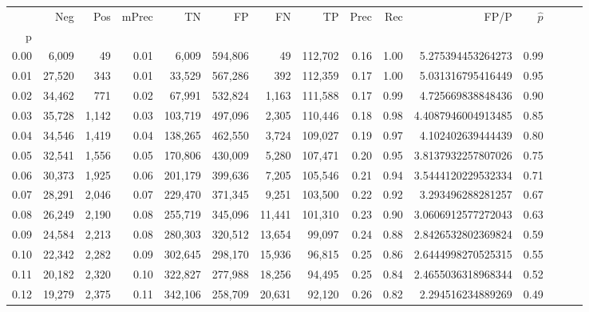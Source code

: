 \begin{tabular}{rrrrrrrrrrrrrrr}
\toprule
{} &     Neg &    Pos & mPrec &       TN &       FP &       FN &       TP &  Prec &   Rec &                   FP/P & $\hat{p}$ \\
p    &         &        &       &          &          &          &          &       &       &                        &           \\
\midrule
0.00 &   6,009 &     49 &  0.01 &    6,009 &  594,806 &       49 &  112,702 &  0.16 &  1.00 &      5.275394453264273 &      0.99 \\
0.01 &  27,520 &    343 &  0.01 &   33,529 &  567,286 &      392 &  112,359 &  0.17 &  1.00 &      5.031316795416449 &      0.95 \\
0.02 &  34,462 &    771 &  0.02 &   67,991 &  532,824 &    1,163 &  111,588 &  0.17 &  0.99 &      4.725669838848436 &      0.90 \\
0.03 &  35,728 &  1,142 &  0.03 &  103,719 &  497,096 &    2,305 &  110,446 &  0.18 &  0.98 &     4.4087946004913485 &      0.85 \\
0.04 &  34,546 &  1,419 &  0.04 &  138,265 &  462,550 &    3,724 &  109,027 &  0.19 &  0.97 &      4.102402639444439 &      0.80 \\
0.05 &  32,541 &  1,556 &  0.05 &  170,806 &  430,009 &    5,280 &  107,471 &  0.20 &  0.95 &     3.8137932257807026 &      0.75 \\
0.06 &  30,373 &  1,925 &  0.06 &  201,179 &  399,636 &    7,205 &  105,546 &  0.21 &  0.94 &     3.5444120229532334 &      0.71 \\
0.07 &  28,291 &  2,046 &  0.07 &  229,470 &  371,345 &    9,251 &  103,500 &  0.22 &  0.92 &      3.293496288281257 &      0.67 \\
0.08 &  26,249 &  2,190 &  0.08 &  255,719 &  345,096 &   11,441 &  101,310 &  0.23 &  0.90 &     3.0606912577272043 &      0.63 \\
0.09 &  24,584 &  2,213 &  0.08 &  280,303 &  320,512 &   13,654 &   99,097 &  0.24 &  0.88 &     2.8426532802369824 &      0.59 \\
0.10 &  22,342 &  2,282 &  0.09 &  302,645 &  298,170 &   15,936 &   96,815 &  0.25 &  0.86 &     2.6444998270525315 &      0.55 \\
0.11 &  20,182 &  2,320 &  0.10 &  322,827 &  277,988 &   18,256 &   94,495 &  0.25 &  0.84 &     2.4655036318968344 &      0.52 \\
0.12 &  19,279 &  2,375 &  0.11 &  342,106 &  258,709 &   20,631 &   92,120 &  0.26 &  0.82 &      2.294516234889269 &      0.49 \\

\end{tabular}
